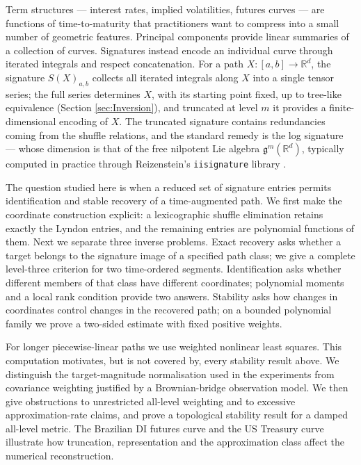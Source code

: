 \documentclass[11pt,english]{article}
\theoremstyle{definition}
\theoremstyle{remark}
\begin{document}
Term structures --- interest rates, implied volatilities, futures curves
--- are functions of time-to-maturity that practitioners want to compress
into a small number of geometric features. Principal components provide linear summaries of a collection of curves.
Signatures instead encode an individual curve through iterated integrals
and respect concatenation. For a path $X:[a,b]\to\mathbb{R}^{d}$,
the signature $S(X)_{a,b}$ collects all iterated integrals along
$X$ into a single tensor series; the full series determines $X$, with its starting point fixed, up to
tree-like equivalence (Section \ref{sec:Inversion}), and truncated at
level $m$ it provides a finite-dimensional encoding of $X$. The
truncated signature contains redundancies coming
from the shuffle relations, and the standard remedy is the log signature
--- whose dimension is that of the free nilpotent Lie algebra $\mathfrak{g}^{m}(\mathbb{R}^{d})$,
typically computed in practice through Reizenstein's \texttt{iisignature}
library \cite{iisignature,iisignature 1004,log signatures}.


The question studied here is when a reduced set of signature entries
permits identification and stable recovery of a time-augmented path.
We first make the coordinate construction explicit: a lexicographic
shuffle elimination retains exactly the Lyndon entries, and the
remaining entries are polynomial functions of them. Next we separate
three inverse problems. Exact recovery asks whether a target belongs
to the signature image of a specified path class; we give a complete
level-three criterion for two time-ordered segments. Identification
asks whether different members of that class have different
coordinates; polynomial moments and a local rank condition provide
two answers. Stability asks how changes in coordinates control changes
in the recovered path; on a bounded polynomial family we prove a
two-sided estimate with fixed positive weights.

For longer piecewise-linear paths we use weighted nonlinear
least squares. This computation motivates, but is not covered by,
every stability result above. We distinguish the target-magnitude
normalisation used in the experiments from covariance weighting
justified by a Brownian-bridge observation model. We then give
obstructions to unrestricted all-level weighting and to excessive
approximation-rate claims, and prove a topological stability result
for a damped all-level metric. The Brazilian DI futures curve and
the US Treasury curve illustrate how truncation, representation and
the approximation class affect the numerical reconstruction.
\end{document}
